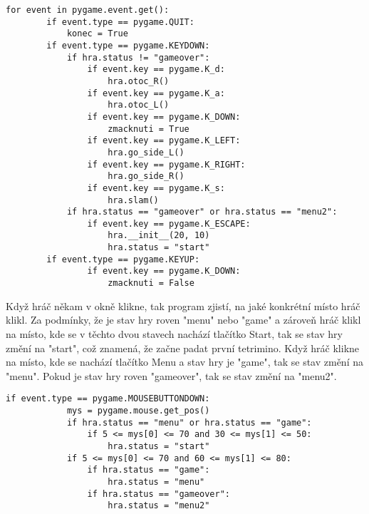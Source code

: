 \documentclass[12pt]{report}			%
\begin{document}
\begin{lstlisting}[title={Program tetris.py}, caption={Ošetření událostí}, 							label={lst:tetris.py}]
    for event in pygame.event.get():
        if event.type == pygame.QUIT:
            konec = True
        if event.type == pygame.KEYDOWN:
            if hra.status != "gameover":
                if event.key == pygame.K_d:
                    hra.otoc_R()
                if event.key == pygame.K_a:
                    hra.otoc_L()
                if event.key == pygame.K_DOWN:
                    zmacknuti = True
                if event.key == pygame.K_LEFT:
                    hra.go_side_L()
                if event.key == pygame.K_RIGHT:
                    hra.go_side_R()
                if event.key == pygame.K_s:
                    hra.slam()
            if hra.status == "gameover" or hra.status == "menu2":
                if event.key == pygame.K_ESCAPE:
                    hra.__init__(20, 10)
                    hra.status = "start"
        if event.type == pygame.KEYUP:
                if event.key == pygame.K_DOWN:
                    zmacknuti = False
\end{lstlisting}
Když hráč někam v okně klikne, tak program zjistí, na jaké konkrétní místo hráč klikl. Za podmínky, že je stav hry roven "menu" nebo "game" a zároveň hráč klikl na místo, kde se v těchto dvou stavech nachází tlačítko Start, tak se stav hry změní na "start", což znamená, že začne padat první tetrimino. Když hráč klikne na místo, kde se nachází tlačítko Menu a stav hry je "game", tak se stav změní na "menu".
Pokud je stav hry roven "gameover", tak se stav změní na "menu2".
\begin{lstlisting}[title={Program tetris.py}, caption={Ošetření události kliknutí myší}, 							label={lst:tetris.py}]
        if event.type == pygame.MOUSEBUTTONDOWN:
            mys = pygame.mouse.get_pos()
            if hra.status == "menu" or hra.status == "game":
                if 5 <= mys[0] <= 70 and 30 <= mys[1] <= 50:
                    hra.status = "start"
            if 5 <= mys[0] <= 70 and 60 <= mys[1] <= 80:
                if hra.status == "game":    
                    hra.status = "menu"
                if hra.status == "gameover":    
                    hra.status = "menu2"
\end{lstlisting}
\end{document}
